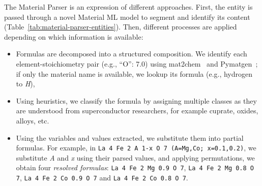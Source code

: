 The Material Parser is an expression of different approaches. 
First, the entity is passed through a novel Material ML model to segment and identify its content (Table~\ref{tab:material-parser-entities}).
Then, different processes are applied depending on which information is available: 
\begin{itemize}
    \item Formulas are decomposed into a structured composition. We identify each element-stoichiometry pair (e.g., ``O'': 7.0) using mat2chem~\cite{kononova2019text} and Pymatgen~\cite{Ong2013}; if only the material name is available, we lookup its formula (e.g., hydrogen to \textit{H}),
    \item Using heuristics, we classify the formula by assigning multiple classes as they are understood from superconductor researchers, for example cuprate, oxides, alloys, etc.
    \item Using the variables and values extracted, we substitute them into partial formulas. For example, in \texttt{La 4 Fe 2 A 1-x O 7 (A=Mg,Co; x=0.1,0.2)}, we substitute \textit{A} and \textit{x} using their parsed values, and applying permutations, we obtain four \textit{resolved formulas}: \texttt{La 4 Fe 2 Mg 0.9 O 7}, \texttt{La 4 Fe 2 Mg 0.8 O 7}, \texttt{La 4 Fe 2 Co 0.9 O 7} and \texttt{La 4 Fe 2 Co 0.8 O 7}.
\end{itemize}

